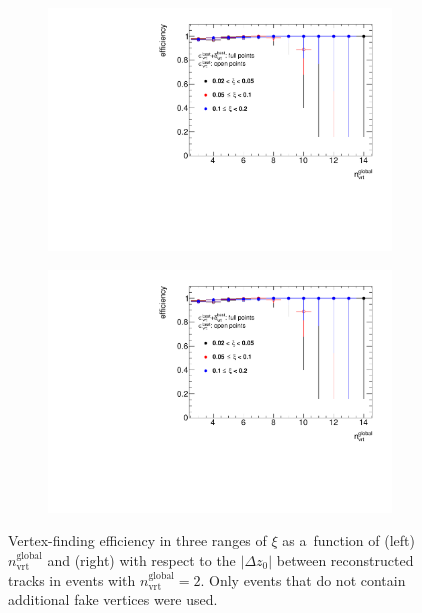 \begin{figure}[t!]
	\centering
	\begin{subfigure}{.49\textwidth}
		\includegraphics[width=\textwidth,page=1]{chapters/chrgSTAR/img/vertex/vertexEffi_ksi_noFake.pdf}
	\end{subfigure}
	\begin{subfigure}{.49\textwidth}
		\includegraphics[width=\textwidth,page=8]{chapters/chrgSTAR/img/vertex/vertexEffi_ksi_noFake.pdf}
	\end{subfigure}
	\caption{Vertex-finding efficiency in three ranges of $\xi$ as a~function of  (left) $n^\textrm{global}_\textrm{vrt}$ and (right) with respect to the $|\Delta z_0|$ between reconstructed tracks in events with $n^\textrm{global}_\textrm{vrt}=2$. Only events that do not contain additional fake vertices were used. }
	\label{fig:vertexEffi_noFake}
\end{figure}

